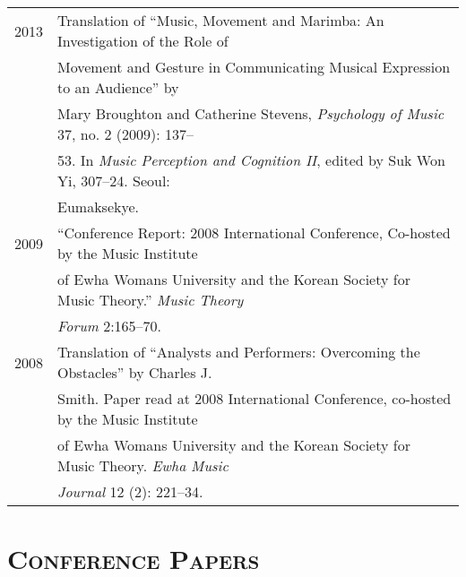 \documentclass[a4paper,11pt,draft]{article}
\begin{document}
  \hspace*{-0.25cm}
  \begin{tabular}{p{2.5cm} p{12.5cm}}
    2013 & Translation of “Music, Movement and Marimba: An Investigation of the Role of\\
    & Movement and Gesture in Communicating Musical Expression to an Audience” by\\
    & Mary Broughton and Catherine Stevens, \textit{Psychology of Music} 37, no. 2 (2009): 137–\\
    & 53. In \textit{Music Perception and Cognition II}, edited by Suk Won Yi, 307–24. Seoul:\\
    & Eumaksekye.\\[2mm]
    
    2009 & “Conference Report: 2008 International Conference, Co-hosted by the Music Institute\\
    & of Ewha Womans University and the Korean Society for Music Theory.” \textit{Music Theory}\\
    & \textit{Forum} 2:165–70.\\[2mm]
    
    2008 & Translation of “Analysts and Performers: Overcoming the Obstacles” by Charles J.\\
    & Smith. Paper read at 2008 International Conference, co-hosted by the Music Institute\\
    & of Ewha Womans University and the Korean Society for Music Theory. \textit{Ewha Music}\\
    & \textit{Journal} 12 (2): 221–34.
  \end{tabular}
  
  \vspace{2.5mm}
  
  \section*{\textsc{Conference Papers}}
  
\end{document}
